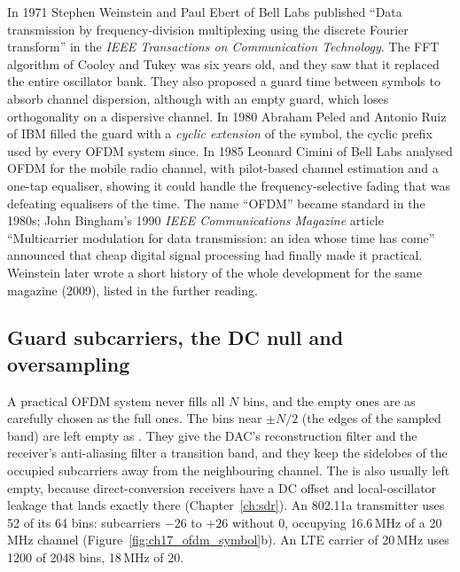 \begin{history}
In 1971 Stephen Weinstein and Paul Ebert of Bell Labs published ``Data transmission by
frequency-division multiplexing using the discrete Fourier transform'' in the \emph{IEEE Transactions
on Communication Technology}. The FFT algorithm of Cooley and Tukey was six years old, and they saw
that it replaced the entire oscillator bank. They also proposed a guard time between symbols to
absorb channel dispersion, although with an empty guard, which loses orthogonality on a dispersive
channel. In 1980 Abraham Peled and Antonio Ruiz of IBM filled the guard with a \emph{cyclic extension}
of the symbol, the cyclic prefix used by every OFDM system since. In 1985 Leonard Cimini of Bell Labs
analysed OFDM for the mobile radio channel, with pilot-based channel estimation and a one-tap
equaliser, showing it could handle the frequency-selective fading that was defeating equalisers of
the time. The name ``OFDM'' became standard in the 1980s; John Bingham's 1990 \emph{IEEE Communications
Magazine} article ``Multicarrier modulation for data transmission: an idea whose time has come''
announced that cheap digital signal processing had finally made it practical. Weinstein later wrote
a short history of the whole development for the same magazine (2009), listed in the further reading.
\end{history}

\subsection{Guard subcarriers, the DC null and oversampling}

A practical OFDM system never fills all $N$ bins, and the empty ones are as carefully chosen as
the full ones. The bins near $\pm N/2$ (the edges of the sampled band) are left empty as
. They give the DAC's reconstruction filter and the receiver's
anti-aliasing filter a transition band, and they keep the sidelobes of the occupied subcarriers
away from the neighbouring channel. The  is also usually left empty, because
direct-conversion receivers have a DC offset and local-oscillator leakage that lands exactly there
(Chapter~\ref{ch:sdr}). An 802.11a transmitter uses 52 of its 64 bins: subcarriers $-26$ to $+26$
without 0, occupying 16.6\,MHz of a 20\,MHz channel (Figure~\ref{fig:ch17_ofdm_symbol}b). An LTE
carrier of 20\,MHz uses 1200 of 2048 bins, 18\,MHz of 20.

